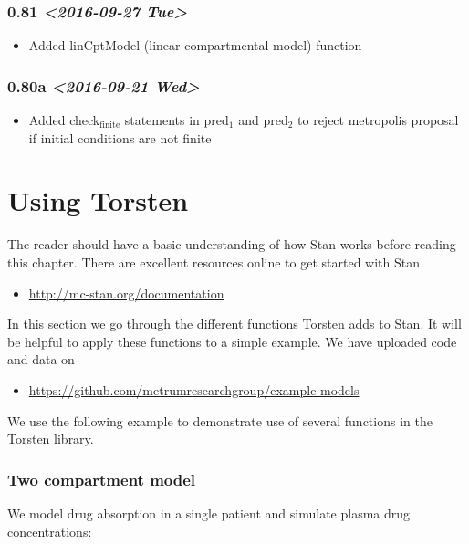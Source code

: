 \documentclass[11pt, reqno]{amsbook}
\numberwithin{section}{chapter}
\theoremstyle{remark}
\begin{document}
\subsection*{0.81 \textit{<2016-09-27 Tue>}}
\label{sec:orgd5c003e}
\begin{itemize}
\item Added
\label{sec:org4d1864e}
linCptModel (linear compartmental model) function
\end{itemize}

\subsection*{0.80a \textit{<2016-09-21 Wed>}}
\label{sec:org2469271}
\begin{itemize}
\item Added
\label{sec:org7435c7c}
check\(_{\text{finite}}\) statements in pred\(_{\text{1}}\) and pred\(_{\text{2}}\) to reject metropolis proposal if initial conditions are not finite
\end{itemize}




\chapter{Using Torsten}
\label{sec:org3918ecd}
The reader should have a basic understanding of how Stan works before
reading this chapter. There are excellent resources online to get
started with Stan

\begin{itemize}
\item \href{http://mc-stan.org/documentation}{http://mc-stan.org/documentation}
\end{itemize}


In this section we go through the different functions Torsten adds to
Stan. It will be helpful to apply these functions to a simple
example. We have uploaded code and data on

\begin{itemize}
\item \href{https://github.com/metrumresearchgroup/example-models}{https://github.com/metrumresearchgroup/example-models}
\end{itemize}

We use the following example to demonstrate use of several functions in the Torsten library.
\subsection*{Two compartment model}
\label{sec:orgf21ab7b}
We model drug absorption in a single patient and simulate plasma drug concentrations:
\end{document}

